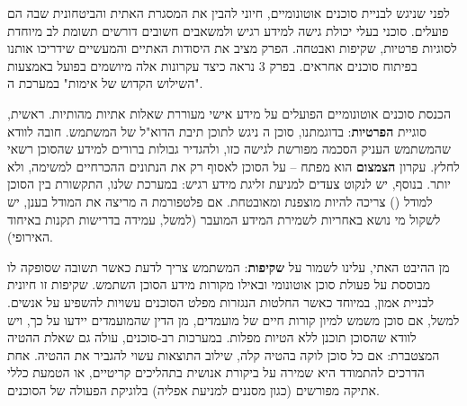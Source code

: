 
לפני שניגש לבניית סוכנים אוטונומיים, חיוני להבין את המסגרת האתית והביטחונית שבה הם פועלים. סוכני  בעלי יכולת גישה למידע רגיש ולמשאבים חשובים דורשים תשומת לב מיוחדת לסוגיות פרטיות, שקיפות ואבטחה. הפרק מציב את היסודות האתיים והמעשיים שידריכו אותנו בפיתוח סוכנים אחראים. בפרק \num{3} נראה כיצד עקרונות אלה מיושמים בפועל באמצעות "השילוש הקדוש של אימות" במערכת ה.


הכנסת סוכנים אוטונומיים הפועלים על מידע אישי מעוררת שאלות אתיות מהותיות. ראשית, סוגיית \textbf{הפרטיות}: בדוגמתנו, סוכן ה ניגש לתוכן תיבת הדוא"ל של המשתמש. חובה לוודא שהמשתמש העניק הסכמה מפורשת לגישה כזו, ולהגדיר גבולות ברורים למידע שהסוכן רשאי לחלץ. עקרון \textbf{הצמצום} הוא מפתח – על הסוכן לאסוף רק את הנתונים ההכרחיים למשימה, ולא יותר. בנוסף, יש לנקוט צעדים למניעת זליגת מידע רגיש: במערכת שלנו, התקשורת בין הסוכן למודל () צריכה להיות מוצפנת ומאובטחת. אם פלטפורמת ה מריצה את המודל בענן, יש לשקול מי נושא באחריות לשמירת המידע המועבר (למשל, עמידה בדרישות תקנות \textbf{} באיחוד האירופי).

מן ההיבט האתי, עלינו לשמור על \textbf{שקיפות}: המשתמש צריך לדעת כאשר תשובה שסופקה לו מבוססת על פעולת סוכן אוטונומי ובאילו מקורות מידע הסוכן השתמש. שקיפות זו חיונית לבניית אמון, במיוחד כאשר החלטות הנגזרות מפלט הסוכנים עשויות להשפיע על אנשים. למשל, אם סוכן  משמש למיון קורות חיים של מועמדים, מן הדין שהמועמדים יידעו על כך, ויש לוודא שהסוכן תוכנן ללא הטיות מפלות. במערכות רב-סוכנים, עולה גם שאלת ההטיה המצטברת: אם כל סוכן לוקה בהטיה קלה, שילוב התוצאות עשוי להגביר את ההטיה. אחת הדרכים להתמודד היא שמירה על ביקורת אנושית בתהליכים קריטיים, או הטמעת כללי אתיקה מפורשים (כגון מסננים למניעת אפליה) בלוגיקת הפעולה של הסוכנים.


